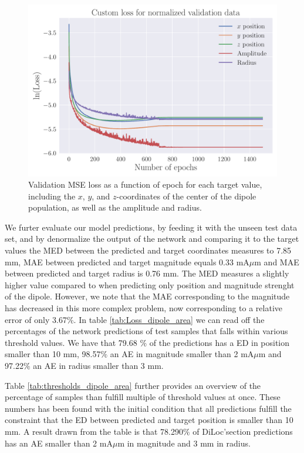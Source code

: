 \documentclass[a4paper, UKenglish, 11pt]{uiomaster}
\begin{document}
\begin{figure}[!htb]
    \centering
    \includegraphics[width=\linewidth]{figures/NN_area/Custom_Loss_mse_targets_area_seed_42_cnn_32_0.001_0.35_0.1_0_1500_(0).pdf}
    \caption{Validation MSE loss as a function of epoch for each target value, including the $x$, $y$, and $z$-coordinates of the center of the dipole population, as well as the amplitude and radius.}
    \label{fig:dipole_area_target_result}
\end{figure}

\FloatBarrier


We furter evaluate our model predictions, by feeding it with the unseen test data set, and by denormalize the output of the network and comparing it to the target values the MED between the predicted and target coordinates measures to 7.85 mm, MAE between predicted and target magnitude equals 0.33 mA$\mu$m and MAE between predicted and target radius is 0.76 mm. The MED measures a slightly higher value compared to when predicting only position and magnitude strenght of the dipole. However, we note that the MAE corresponding to the magnitude has decreased in this more complex problem, now corresponding to a relative error of only 3.67$\%$. In table \ref{tab:Loss_dipole_area} we can read off the percentages of the network predictions of test samples that falls within various threshold values. We have that 79.68 $\%$ of the predictions has a ED in position smaller than 10 mm, 98.57$\%$ an AE in magnitude smaller than 2 mA$\mu$m and 97.22$\%$ an AE in radius smaller than 3 mm.

Table \ref{tab:thresholds_dipole_area} further provides an overview of the percentage of samples than fulfill multiple of threshold values at once. These numbers has been found with the initial condition that all predictions fulfill the constraint that the ED between predicted and target position is smaller than 10 mm. A result drawn from the table is that 78.290$\%$ of DiLoc'section predictions has an AE smaller than 2 mA$\mu$m in magnitude and $3$ mm in radius.
\end{document}
